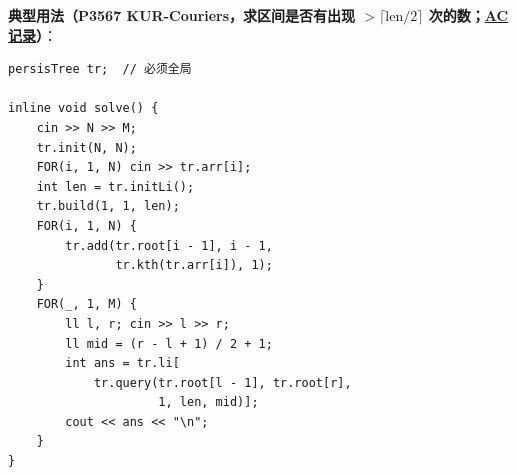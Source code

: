 		\textbf{典型用法（P3567 KUR-Couriers，求区间是否有出现 $> \lceil \text{len} / 2 \rceil$ 次的数；\href{https://www.luogu.com.cn/record/218724163}{AC 记录}）}：

		\begin{verbatim}
persisTree tr;  // 必须全局

inline void solve() {
    cin >> N >> M;
    tr.init(N, N);
    FOR(i, 1, N) cin >> tr.arr[i];
    int len = tr.initLi();
    tr.build(1, 1, len);
    FOR(i, 1, N) {
        tr.add(tr.root[i - 1], i - 1,
               tr.kth(tr.arr[i]), 1);
    }
    FOR(_, 1, M) {
        ll l, r; cin >> l >> r;
        ll mid = (r - l + 1) / 2 + 1;
        int ans = tr.li[
            tr.query(tr.root[l - 1], tr.root[r],
                     1, len, mid)];
        cout << ans << "\n";
    }
}
		\end{verbatim}
